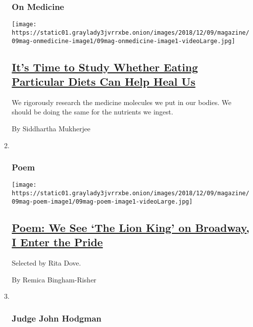 \begin{enumerate}
{  \subsubsection{On Medicine}\label{on-medicine}}

  \texttt{[image: https://static01.graylady3jvrrxbe.onion/images/2018/12/09/magazine/09mag-onmedicine-image1/09mag-onmedicine-image1-videoLarge.jpg]}

  \hypertarget{its-time-to-study-whether-eating-particular-diets-can-help-heal-us}{%
  \subsection{\texorpdfstring{\href{/2018/12/05/magazine/its-time-to-study-whether-eating-particular-diets-can-help-heal-us.html}{It's
  Time to Study Whether Eating Particular Diets Can Help Heal
  Us}}{It's Time to Study Whether Eating Particular Diets Can Help Heal Us}}\label{its-time-to-study-whether-eating-particular-diets-can-help-heal-us}}

  We rigorously research the medicine molecules we put in our bodies. We
  should be doing the same for the nutrients we ingest.

  By Siddhartha Mukherjee
\item ~
  \hypertarget{poem}{%
  \subsubsection{Poem}\label{poem}}

  \texttt{[image: https://static01.graylady3jvrrxbe.onion/images/2018/12/09/magazine/09mag-poem-image1/09mag-poem-image1-videoLarge.jpg]}

  \hypertarget{poem-we-see-the-lion-king-on-broadway-i-enter-the-pride}{%
  \subsection{\texorpdfstring{\href{/2018/12/07/magazine/poem-we-see-the-lion-king-on-broadway-i-enter-the-pride.html}{Poem:
  We See `The Lion King' on Broadway, I Enter the
  Pride}}{Poem: We See `The Lion King' on Broadway, I Enter the Pride}}\label{poem-we-see-the-lion-king-on-broadway-i-enter-the-pride}}

  Selected by Rita Dove.

  By Remica Bingham-Risher
\item ~
  \hypertarget{judge-john-hodgman}{%
  \subsubsection{Judge John Hodgman}\label{judge-john-hodgman}}


\end{enumerate}
